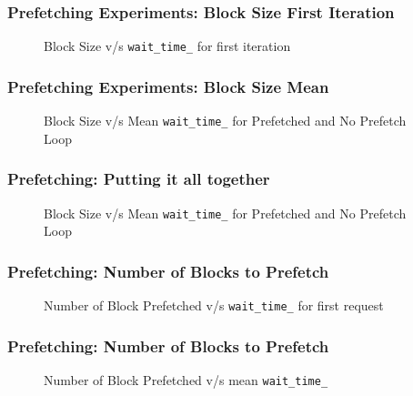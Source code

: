 \documentclass{beamer}
\begin{document}
\begin{frame}\frametitle{Prefetching Experiments: Block Size First Iteration}
  \pause
  \begin{figure}[h]
    \resizebox{.9\linewidth}{!}{}
    \caption{Block Size v/s \texttt{wait\_time\_} for first iteration}
  \end{figure}
\end{frame}

\begin{frame}\frametitle{Prefetching Experiments: Block Size Mean}
  \pause
  \begin{figure}[h]
    \resizebox{.9\linewidth}{!}{}
    \caption{Block Size v/s Mean \texttt{wait\_time\_} for Prefetched and No Prefetch Loop}
  \end{figure}
\end{frame}

\begin{frame}\frametitle{Prefetching: Putting it all together}
  \pause
  \begin{figure}[h]
    \resizebox{.9\linewidth}{!}{}
    \caption{Block Size v/s Mean \texttt{wait\_time\_} for Prefetched and No Prefetch Loop}
  \end{figure}
\end{frame}

\begin{frame}\frametitle{Prefetching: Number of Blocks to Prefetch}
  \pause
  \begin{figure}[h]
    \resizebox{.9\linewidth}{!}{}
    \caption{Number of Block Prefetched v/s \texttt{wait\_time\_} for first request}
  \end{figure}

\end{frame}

\begin{frame}\frametitle{Prefetching: Number of Blocks to Prefetch}
  \pause
  \begin{figure}[h]
    \resizebox{.9\linewidth}{!}{}
    \caption{Number of Block Prefetched v/s mean \texttt{wait\_time\_}}
  \end{figure}
\end{frame}
\end{document}
